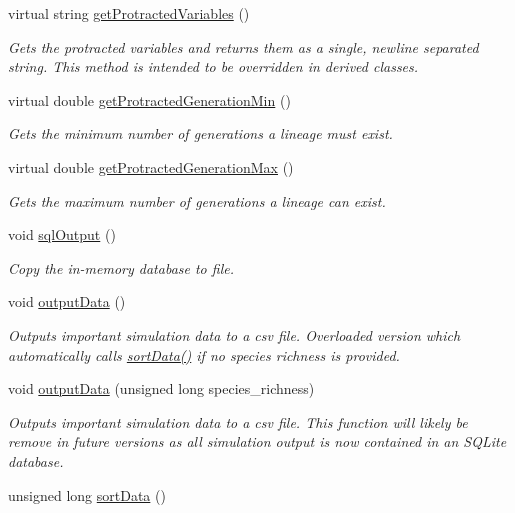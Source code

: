 \begin{DoxyCompactItemize}
virtual string \hyperlink{class_tree_a34c0808026bf00546c8f9786376be730}{get\+Protracted\+Variables} ()
\begin{DoxyCompactList}\small\item\em Gets the protracted variables and returns them as a single, newline separated string. This method is intended to be overridden in derived classes. \end{DoxyCompactList}\item 
virtual double \hyperlink{class_tree_a6ffc42e941f352cd74f01f6f7011f00b}{get\+Protracted\+Generation\+Min} ()
\begin{DoxyCompactList}\small\item\em Gets the minimum number of generations a lineage must exist. \end{DoxyCompactList}\item 
virtual double \hyperlink{class_tree_a0c5e746982a87f24c083f4534bf92b45}{get\+Protracted\+Generation\+Max} ()
\begin{DoxyCompactList}\small\item\em Gets the maximum number of generations a lineage can exist. \end{DoxyCompactList}\item 
void \hyperlink{class_tree_a8cd3db7add1884ea53b0d98002d39cd3}{sql\+Output} ()
\begin{DoxyCompactList}\small\item\em Copy the in-\/memory database to file. \end{DoxyCompactList}\item 
void \hyperlink{class_tree_afdf680e187c25ed39d1e66542ce44cc3}{output\+Data} ()\hypertarget{class_tree_afdf680e187c25ed39d1e66542ce44cc3}{}\label{class_tree_afdf680e187c25ed39d1e66542ce44cc3}

\begin{DoxyCompactList}\small\item\em Outputs important simulation data to a csv file. Overloaded version which automatically calls \hyperlink{class_tree_a2d2065bbebee8b55270d2691d40cd974}{sort\+Data()} if no species richness is provided. \end{DoxyCompactList}\item 
void \hyperlink{class_tree_a5acf7d0eea9ea2ef4928bb6691b87724}{output\+Data} (unsigned long species\+\_\+richness)
\begin{DoxyCompactList}\small\item\em Outputs important simulation data to a csv file. This function will likely be remove in future versions as all simulation output is now contained in an S\+Q\+Lite database. \end{DoxyCompactList}\item 
unsigned long \hyperlink{class_tree_a2d2065bbebee8b55270d2691d40cd974}{sort\+Data} ()\hypertarget{class_tree_a2d2065bbebee8b55270d2691d40cd974}{}\label{class_tree_a2d2065bbebee8b55270d2691d40cd974}


\end{DoxyCompactItemize}
